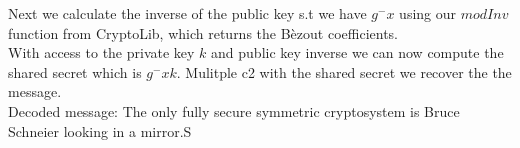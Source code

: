 \documentclass{article}
\begin{document}
Next we calculate the inverse of the public key s.t we have $g^-x$ using our $modInv$ function from CryptoLib, which returns the Bèzout coefficients.\\

With access to the private key $k$ and public key inverse we can now compute the shared secret which is $g^-xk$. Mulitple c2 with the shared secret we recover the the message.\\

Decoded message: The only fully secure symmetric cryptosystem is Bruce Schneier looking in a mirror.S       
\end{document}
